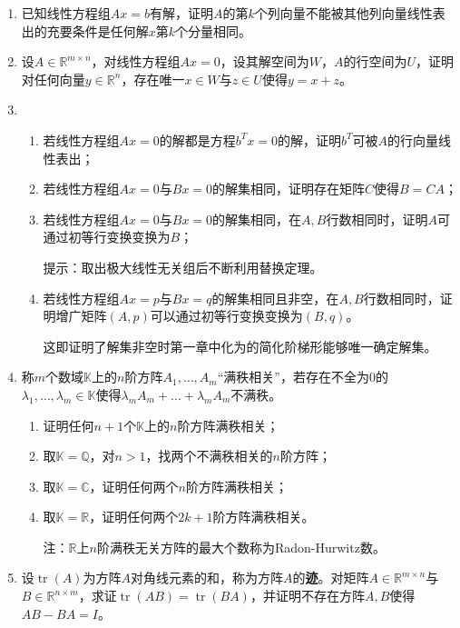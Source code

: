 \documentclass[a4paper,UTF8,fontset=windows]{ctexart}
\DeclareMathOperator{\tr}{tr}
\newcommand*{\note}{\noindent *}
\begin{document}
\begin{enumerate}
    \item 已知线性方程组$Ax=b$有解，证明$A$的第$k$个列向量不能被其他列向量线性表出的充要条件是任何解$x$第$k$个分量相同。
    
    \item 设$A\in\mathbb{R}^{m\times n}$，对线性方程组$Ax=0$，设其解空间为$W$，$A$的行空间为$U$，证明对任何向量$y\in\mathbb{R}^n$，存在唯一$x\in W$与$z\in U$使得$y=x+z$。

    \item 
    \begin{enumerate}[(1)]
        \item 若线性方程组$Ax=0$的解都是方程$b^Tx=0$的解，证明$b^T$可被$A$的行向量线性表出；
        \item 若线性方程组$Ax=0$与$Bx=0$的解集相同，证明存在矩阵$C$使得$B=CA$；
        \item 若线性方程组$Ax=0$与$Bx=0$的解集相同，在$A,B$行数相同时，证明$A$可通过初等行变换变换为$B$；
        
        \note 提示：取出极大线性无关组后不断利用替换定理。
        \item 若线性方程组$Ax=p$与$Bx=q$的解集相同且非空，在$A,B$行数相同时，证明增广矩阵$(A,p)$可以通过初等行变换变换为$(B,q)$。
        
        \note 这即证明了解集非空时第一章中化为的简化阶梯形能够唯一确定解集。
    \end{enumerate}    

    \item 称$m$个数域$\mathbb{K}$上的$n$阶方阵$A_1,\dots,A_m$``满秩相关''，若存在不全为0的$\lambda_1,\dots,\lambda_m\in\mathbb{K}$使得$\lambda_mA_m+\dots+\lambda_mA_m$不满秩。
    \begin{enumerate}[(1)]
        \item 证明任何$n+1$个$\mathbb{K}$上的$n$阶方阵满秩相关；
        \item 取$\mathbb{K}=\mathbb{Q}$，对$n>1$，找两个不满秩相关的$n$阶方阵；
        \item 取$\mathbb{K}=\mathbb{C}$，证明任何两个$n$阶方阵满秩相关；
        \item 取$\mathbb{K}=\mathbb{R}$，证明任何两个$2k+1$阶方阵满秩相关。
        
        注：$\mathbb{R}$上$n$阶满秩无关方阵的最大个数称为Radon-Hurwitz数。
    \end{enumerate}

    \item 设$\tr(A)$为方阵$A$对角线元素的和，称为方阵$A$的\textbf{迹}。对矩阵$A\in\mathbb{R}^{m\times n}$与$B\in\mathbb{R}^{n\times m}$，求证$\tr(AB)=\tr(BA)$，并证明不存在方阵$A,B$使得$AB-BA=I$。
    

\end{enumerate}
\end{document}

